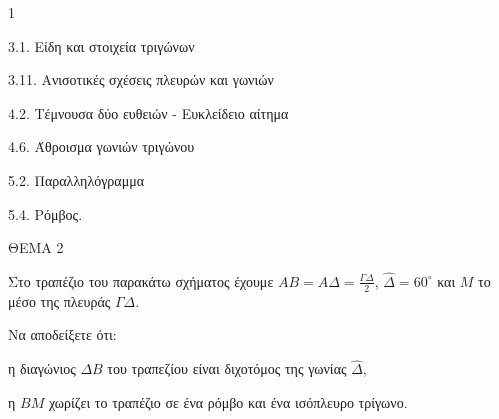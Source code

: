 \begin{ylh}{1}
    \item 3.1. Είδη και στοιχεία τριγώνων
    \item 3.11. Ανισοτικές σχέσεις πλευρών και γωνιών
    \item 4.2. Τέμνουσα δύο ευθειών - Ευκλείδειο αίτημα
    \item 4.6. Άθροισμα γωνιών τριγώνου
    \item 5.2. Παραλληλόγραμμα
    \item 5.4. Ρόμβος.
\end{ylh}

ΘΕΜΑ 2

Στο τραπέζιο του παρακάτω σχήματος έχουμε $AB = A\Delta = \frac{\Gamma\Delta}{2}$, $\widehat{\Delta} = 60^{\circ}$ και $M$ το μέσο της πλευράς $\Gamma\Delta$.

Να αποδείξετε ότι:

\begin{alist}
\item η διαγώνιος $\Delta B$ του τραπεζίου είναι διχοτόμος της γωνίας $\widehat{\Delta}$, 
\item η $BM$ χωρίζει το τραπέζιο σε ένα ρόμβο και ένα ισόπλευρο τρίγωνο. 

\begin{center}
\end{center}
\end{alist}
